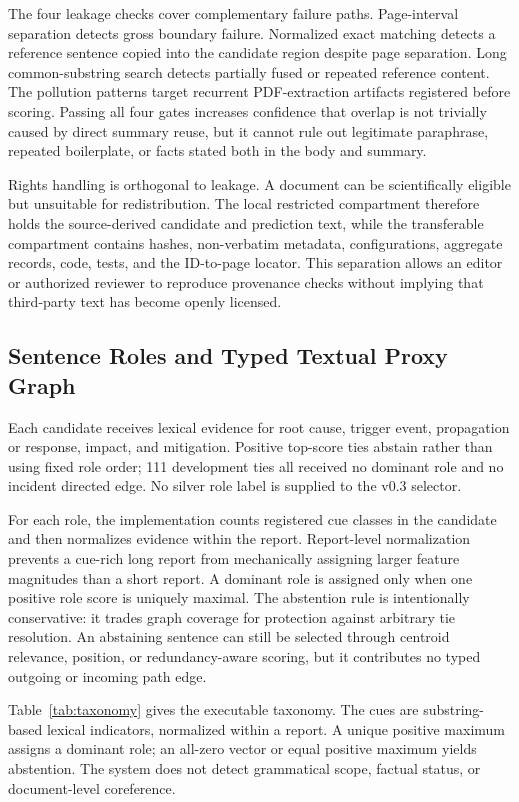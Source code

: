 \documentclass[applsci,article,submit,moreauthors]{Definitions/mdpi}
\begin{document}
The four leakage checks cover complementary failure paths. Page-interval separation detects gross boundary failure. Normalized exact matching detects a reference sentence copied into the candidate region despite page separation. Long common-substring search detects partially fused or repeated reference content. The pollution patterns target recurrent PDF-extraction artifacts registered before scoring. Passing all four gates increases confidence that overlap is not trivially caused by direct summary reuse, but it cannot rule out legitimate paraphrase, repeated boilerplate, or facts stated both in the body and summary.

Rights handling is orthogonal to leakage. A document can be scientifically eligible but unsuitable for redistribution. The local restricted compartment therefore holds the source-derived candidate and prediction text, while the transferable compartment contains hashes, non-verbatim metadata, configurations, aggregate records, code, tests, and the ID-to-page locator. This separation allows an editor or authorized reviewer to reproduce provenance checks without implying that third-party text has become openly licensed.

\subsection{Sentence Roles and Typed Textual Proxy Graph}

Each candidate receives lexical evidence for root cause, trigger event, propagation or response, impact, and mitigation. Positive top-score ties abstain rather than using fixed role order; 111 development ties all received no dominant role and no incident directed edge. No silver role label is supplied to the v0.3 selector.

For each role, the implementation counts registered cue classes in the candidate and then normalizes evidence within the report. Report-level normalization prevents a cue-rich long report from mechanically assigning larger feature magnitudes than a short report. A dominant role is assigned only when one positive role score is uniquely maximal. The abstention rule is intentionally conservative: it trades graph coverage for protection against arbitrary tie resolution. An abstaining sentence can still be selected through centroid relevance, position, or redundancy-aware scoring, but it contributes no typed outgoing or incoming path edge.

Table~\ref{tab:taxonomy} gives the executable taxonomy. The cues are substring-based lexical indicators, normalized within a report. A unique positive maximum assigns a dominant role; an all-zero vector or equal positive maximum yields abstention. The system does not detect grammatical scope, factual status, or document-level coreference.
\end{document}
